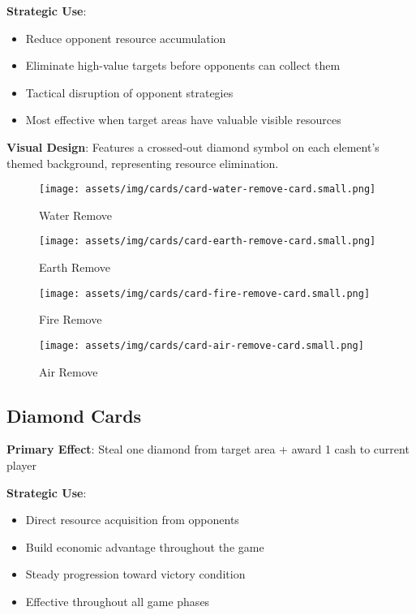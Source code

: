 \documentclass[12pt,a4paper]{article}
\begin{document}
\textbf{Strategic Use}:
\begin{itemize}
    \item Reduce opponent resource accumulation
    \item Eliminate high-value targets before opponents can collect them
    \item Tactical disruption of opponent strategies
    \item Most effective when target areas have valuable visible resources
\end{itemize}

\textbf{Visual Design}: Features a crossed-out diamond symbol on each element's themed background, representing resource elimination.

\begin{figure}[h]
\centering
\begin{minipage}{0.2\textwidth}
    \centering
    \texttt{[image: assets/img/cards/card-water-remove-card.small.png]}
    \caption*{\textcolor{waterblue}{Water Remove}}
\end{minipage}
\hfill
\begin{minipage}{0.2\textwidth}
    \centering
    \texttt{[image: assets/img/cards/card-earth-remove-card.small.png]}
    \caption*{\textcolor{earthgreen}{Earth Remove}}
\end{minipage}
\hfill
\begin{minipage}{0.2\textwidth}
    \centering
    \texttt{[image: assets/img/cards/card-fire-remove-card.small.png]}
    \caption*{\textcolor{firered}{Fire Remove}}
\end{minipage}
\hfill
\begin{minipage}{0.2\textwidth}
    \centering
    \texttt{[image: assets/img/cards/card-air-remove-card.small.png]}
    \caption*{\textcolor{airyellow}{Air Remove}}
\end{minipage}
\end{figure}

\subsection{Diamond Cards}
\textbf{Primary Effect}: Steal one diamond from target area + award 1 cash to current player

\textbf{Strategic Use}:
\begin{itemize}
    \item Direct resource acquisition from opponents
    \item Build economic advantage throughout the game
    \item Steady progression toward victory condition
    \item Effective throughout all game phases
\end{itemize}
\end{document}
